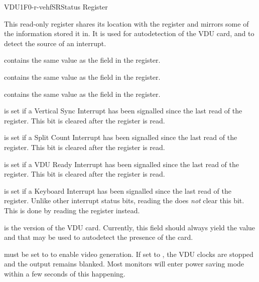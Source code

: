 \begin{ioport}{VDU}{1F0}{-r-vehf}{SR}{Status Register}

  This read-only register shares its location with the  register and
  mirrors some of the information stored it in. It is used for autodetection of
  the VDU card, and to detect the source of an interrupt.

  \begin{bitfield}
  \end{bitfield}

  \begin{description}
     contains the same value as the  field in the  register.

     contains the same value as the  field in the  register.

     contains the same value as the  field in the  register.

     is set if a Vertical Sync Interrupt has been signalled
    since the last read of the  register. This bit is cleared after the register is read.

     is set if a Split Count Interrupt has been signalled
    since the last read of the  register. This bit is cleared after the register is read.

     is set if a VDU Ready Interrupt has been signalled
    since the last read of the  register. This bit is cleared after the register is read.

     is set if a Keyboard Interrupt has been signalled since
    the last read of the  register. Unlike other interrupt status
    bits, reading the  does {\em not\/} clear this bit. This is done
    by reading the  register instead.

     is the version of the VDU card. Currently, this
    field should always yield the value  and that may be used to
    autodetect the presence of the card.

     must be set to  to enable video generation. If set
    to , the VDU clocks are stopped and the output remains blanked. Most
    monitors will enter power saving mode within a few seconds of this
    happening.
  \end{description}

\end{ioport}






